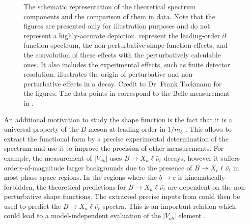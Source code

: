 \begin{figure}[htbp!]
    \caption{\label{fig:xsgamma_theory_sketches} 
    The schematic representation of the theoretical \BtoXsgamma spectrum components and the comparison of them in data.
    Note that the figures are presented only for illustration purposes and do not represent a highly-accurate depiction.
     represent the leading-order $\partial$ function spectrum, the non-perturbative shape function effects, and the convolution of these effects with the perturbatively calculable ones.
    It also includes the experimental effects, such as finite detector resolution.
     illustrates the origin of perturbative and non-perturbative effects in a \BtoXsgamma decay.
    Credit to Dr. Frank Tackmann for the figures. 
    The data points in  correspond to the Belle measurement in \cite{Belle:2009nth}.}
\end{figure}

An additional motivation to study the shape function is the fact that it is a universal property of the $B$ meson at leading order in $1/m_b$ \cite{Neubert:1993um,Bigi:1993ex}.
This allows to extract the functional form by a precise experimental determination of the \BtoXsgamma spectrum and use it to improve the precision of other measurements.
For example, the measurement of $|V_{ub}|$ uses $B\rightarrow X_u \ell \bar{\nu}_{\ell}$ decays, however it suffers orders-of-magnitude larger backgrounds due to the presence of $B\rightarrow X_c \ell \bar{\nu_{\ell}}$ in most phase-space regions.
In the regions where the $b\to c$ is kinematically-forbidden, the theoretical predictions for $B\rightarrow X_u \ell \bar{\nu_{\ell}}$ are dependent on the non-perturbative shape functions.
The extracted precise inputs from \BtoXsgamma could then be used to predict the $B\rightarrow X_u \ell \bar{\nu_{\ell}}$ spectra.
This is an important relation which could lead to a model-independent evaluation of the $|V_{ub}|$ element \cite{Neubert:1993um}.

